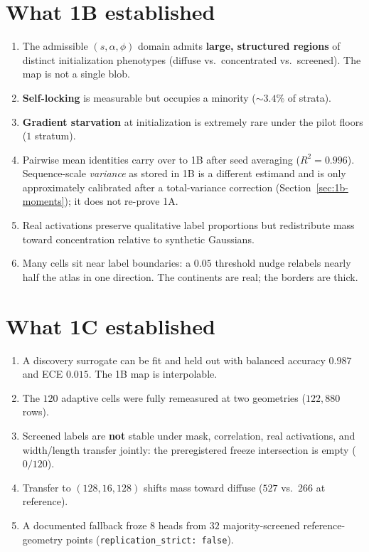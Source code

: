 \documentclass[11pt,a4paper]{report}
\begin{document}
\section{What 1B established}

\begin{enumerate}[leftmargin=*]
  \item The admissible $(s,\alpha,\phi)$ domain admits \textbf{large, structured regions} of distinct initialization phenotypes (diffuse vs.\ concentrated vs.\ screened). The map is not a single blob.
  \item \textbf{Self-locking} is measurable but occupies a minority ($\sim 3.4\%$ of strata).
  \item \textbf{Gradient starvation} at initialization is extremely rare under the pilot floors ($1$ stratum).
  \item Pairwise mean identities carry over to 1B after seed averaging ($R^2=0.996$). Sequence-scale \emph{variance} as stored in 1B is a different estimand and is only approximately calibrated after a total-variance correction (Section~\ref{sec:1b-moments}); it does not re-prove 1A.
  \item Real activations preserve qualitative label proportions but redistribute mass toward concentration relative to synthetic Gaussians.
  \item Many cells sit near label boundaries: a $0.05$ threshold nudge relabels nearly half the atlas in one direction. The continents are real; the borders are thick.
\end{enumerate}

\section{What 1C established}

\begin{enumerate}[leftmargin=*]
  \item A discovery surrogate can be fit and held out with balanced accuracy $0.987$ and ECE $0.015$. The 1B map is interpolable.
  \item The $120$ adaptive cells were fully remeasured at two geometries ($122{,}880$ rows).
  \item Screened labels are \textbf{not} stable under mask, correlation, real activations, and width/length transfer jointly: the preregistered freeze intersection is empty ($0/120$).
  \item Transfer to $(128,16,128)$ shifts mass toward diffuse ($527$ vs.\ $266$ at reference).
  \item A documented fallback froze $8$ heads from $32$ majority-screened reference-geometry points (\texttt{replication\_strict: false}).
\end{enumerate}
\end{document}
